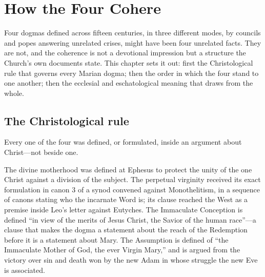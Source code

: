 \sectionguard
\section{How the Four Cohere}

Four dogmas defined across fifteen centuries, in three different modes,
by councils and popes answering unrelated crises, might have been four
unrelated facts. They are not, and the coherence is not a devotional
impression but a structure the Church's own documents state. This chapter
sets it out: first the Christological rule that governs every Marian
dogma; then the order in which the four stand to one another; then the
ecclesial and eschatological meaning that  draws
from the whole.

\subsection*{The Christological rule}

Every one of the four was defined, or formulated, inside an argument
about Christ---not beside one.

The divine motherhood was defined at Ephesus to protect the unity of the
one Christ against a division of the subject. The perpetual virginity
received its exact formulation in canon 3 of a synod convened against
Monothelitism, in a sequence of canons stating who the incarnate Word is;
its  clause reached the West as a premise inside Leo's
letter against Eutyches. The Immaculate Conception is defined ``in view
of the merits of Jesus Christ, the Savior of the human race''---a clause
that makes the dogma a statement about the reach of the Redemption before
it is a statement about Mary. The Assumption is defined of ``the
Immaculate Mother of God, the ever Virgin Mary,'' and is argued from the
victory over sin and death won by the new Adam in whose struggle the new
Eve is associated.

